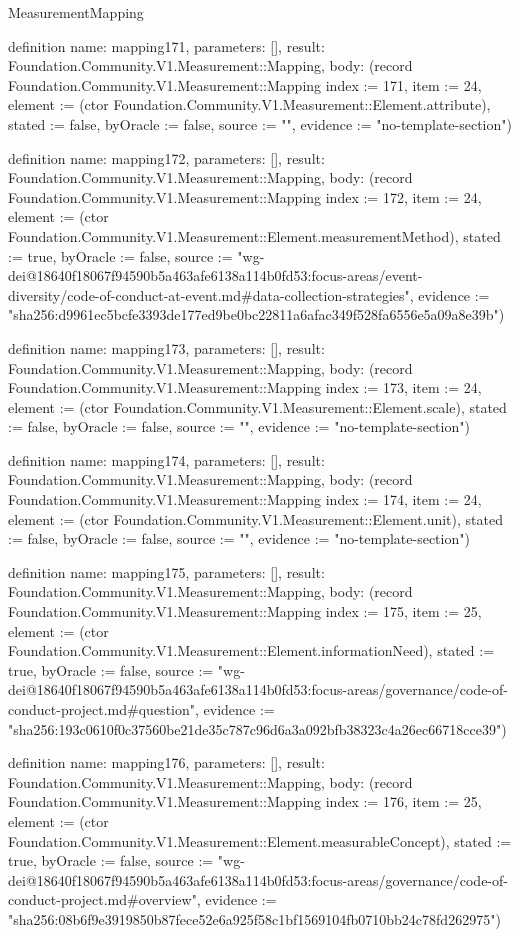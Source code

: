 \begin{lexlean}{MeasurementMapping}
\begin{semanticmodule}
definition{
  name: mapping171,
  parameters: [],
  result: Foundation.Community.V1.Measurement::Mapping,
  body: (record Foundation.Community.V1.Measurement::Mapping {index := 171, item := 24, element := (ctor Foundation.Community.V1.Measurement::Element.attribute), stated := false, byOracle := false, source := "", evidence := "no-template-section"})
}

definition{
  name: mapping172,
  parameters: [],
  result: Foundation.Community.V1.Measurement::Mapping,
  body: (record Foundation.Community.V1.Measurement::Mapping {index := 172, item := 24, element := (ctor Foundation.Community.V1.Measurement::Element.measurementMethod), stated := true, byOracle := false, source := "wg-dei@18640f18067f94590b5a463afe6138a114b0fd53:focus-areas/event-diversity/code-of-conduct-at-event.md#data-collection-strategies", evidence := "sha256:d9961ec5bcfe3393de177ed9be0bc22811a6afac349f528fa6556e5a09a8e39b"})
}

definition{
  name: mapping173,
  parameters: [],
  result: Foundation.Community.V1.Measurement::Mapping,
  body: (record Foundation.Community.V1.Measurement::Mapping {index := 173, item := 24, element := (ctor Foundation.Community.V1.Measurement::Element.scale), stated := false, byOracle := false, source := "", evidence := "no-template-section"})
}

definition{
  name: mapping174,
  parameters: [],
  result: Foundation.Community.V1.Measurement::Mapping,
  body: (record Foundation.Community.V1.Measurement::Mapping {index := 174, item := 24, element := (ctor Foundation.Community.V1.Measurement::Element.unit), stated := false, byOracle := false, source := "", evidence := "no-template-section"})
}

definition{
  name: mapping175,
  parameters: [],
  result: Foundation.Community.V1.Measurement::Mapping,
  body: (record Foundation.Community.V1.Measurement::Mapping {index := 175, item := 25, element := (ctor Foundation.Community.V1.Measurement::Element.informationNeed), stated := true, byOracle := false, source := "wg-dei@18640f18067f94590b5a463afe6138a114b0fd53:focus-areas/governance/code-of-conduct-project.md#question", evidence := "sha256:193c0610f0c37560be21de35c787c96d6a3a092bfb38323c4a26ec66718cce39"})
}

definition{
  name: mapping176,
  parameters: [],
  result: Foundation.Community.V1.Measurement::Mapping,
  body: (record Foundation.Community.V1.Measurement::Mapping {index := 176, item := 25, element := (ctor Foundation.Community.V1.Measurement::Element.measurableConcept), stated := true, byOracle := false, source := "wg-dei@18640f18067f94590b5a463afe6138a114b0fd53:focus-areas/governance/code-of-conduct-project.md#overview", evidence := "sha256:08b6f9e3919850b87fece52e6a925f58c1bf1569104fb0710bb24c78fd262975"})
}


\end{semanticmodule}
\end{lexlean}
